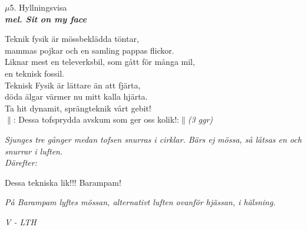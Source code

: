 \documentclass[a6paper,10pt]{article}
\newcommand{\mel}[1]{\small\textbf{\textit{mel. #1 \\}}}
\begin{document}
\setlength{\oddsidemargin}{-0.37in}
\noindent
\begin{center}
\Large $\mu$5. Hyllningsvisa\\
\mel{Sit on my face}
\end{center}
Teknik fysik är mössbeklädda töntar,\\
mammas pojkar och en samling pappas flickor.\\
Liknar mest en televerksbil, som gått för många mil,\\
en teknisk fossil.
\vspace{5pt}\\
Teknisk Fysik är lättare än att fjärta,\\
döda älgar värmer nu mitt kalla hjärta.\\
Ta hit dynamit, sprängteknik vårt gebit!\\
$\|$: Dessa tofsprydda avskum som ger oss kolik!:$\|$\textit{(3 ggr)}
\begin{center}
\textit{Sjunges tre gånger medan tofsen snurras i cirklar. Bärs ej mössa, så låtsas en och snurrar i luften.\\ Därefter:}
\end{center}
Dessa tekniska lik!!! Barampam!
\begin{center}
\textit{På Barampam lyftes mössan, alternativt luften ovanför hjässan, i hälsning.}
\end{center}
\begin{flushright}
\textit{V - LTH}
\end{flushright}
\end{document}
